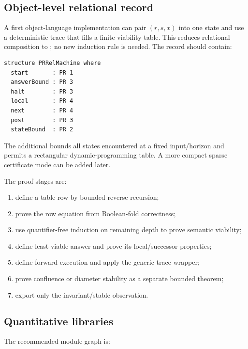 \subsection{Object-level relational record}

A first object-language implementation can pair $(r,s,x)$ into one state and use a deterministic trace that fills a finite viability table.  This reduces relational composition to ; no new induction rule is needed.  The record should contain:

\begin{lstlisting}
structure PRRelMachine where
  start       : PR 1
  answerBound : PR 3
  halt        : PR 3
  local       : PR 4
  next        : PR 4
  post        : PR 3
  stateBound  : PR 2
\end{lstlisting}

The additional  bounds all states encountered at a fixed input/horizon and permits a rectangular dynamic-programming table.  A more compact sparse certificate mode can be added later.

The proof stages are:
\begin{enumerate}[label=\arabic*.]
\item define a table row by bounded reverse recursion;
\item prove the row equation from Boolean-fold correctness;
\item use quantifier-free induction on remaining depth to prove semantic viability;
\item define least viable answer and prove its local/successor properties;
\item define forward execution and apply the generic trace wrapper;
\item prove confluence or diameter stability as a separate bounded theorem;
\item export only the invariant/stable observation.
\end{enumerate}

\subsection{Quantitative libraries}

The recommended module graph is:

